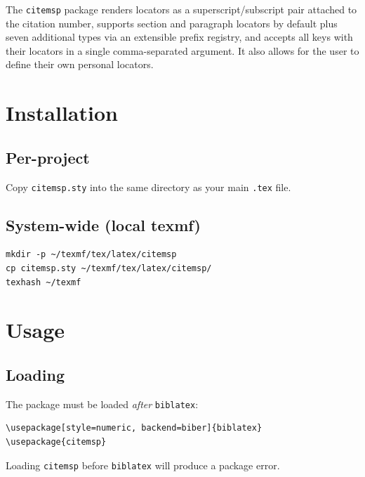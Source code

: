 \documentclass[11pt, a4paper]{article}
\newcommand{\pkg}[1]{\texttt{#1}}
\begin{document}
\noindent The \pkg{citemsp} package renders locators as a superscript/subscript pair attached to the citation number, supports section and paragraph locators by default plus seven additional types via an extensible prefix registry, and accepts all keys with their locators in a single comma-separated argument. It also allows for the user to define their own personal locators.


\section{Installation}

\subsection{Per-project}

Copy \texttt{citemsp.sty} into the same directory as your main \texttt{.tex} file.

\subsection{System-wide (local texmf)}

\begin{tcolorbox}[colback=gray!5, colframe=gray!40, boxrule=0.5pt, arc=2pt, top=6pt, bottom=6pt, left=10pt, right=10pt]
\begin{verbatim}
mkdir -p ~/texmf/tex/latex/citemsp
cp citemsp.sty ~/texmf/tex/latex/citemsp/
texhash ~/texmf
\end{verbatim}
\end{tcolorbox}


\section{Usage}

\subsection{Loading}

The package must be loaded \emph{after} \pkg{biblatex}:
%
\begin{tcolorbox}[colback=gray!5, colframe=gray!40, boxrule=0.5pt, arc=2pt, top=6pt, bottom=6pt, left=10pt, right=10pt]
\begin{verbatim}
\usepackage[style=numeric, backend=biber]{biblatex}
\usepackage{citemsp}
\end{verbatim}
\end{tcolorbox}
%
\noindent Loading \pkg{citemsp} before \pkg{biblatex} will produce a package error.
\end{document}
